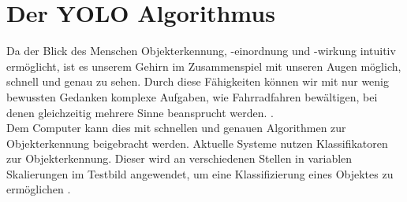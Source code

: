 { 
	
	\section{Der YOLO Algorithmus \label{subsec:YOLO_Alg}} 
	{Da der Blick des Menschen Objekterkennung, -einordnung und -wirkung intuitiv ermöglicht, ist es unserem Gehirn im Zusammenspiel mit unseren Augen möglich, schnell und genau zu sehen. Durch diese Fähigkeiten können wir mit nur wenig bewussten Gedanken komplexe Aufgaben, wie Fahrradfahren bewältigen, bei denen gleichzeitig mehrere Sinne beansprucht werden. \citep{Redmon2016}. \\
	Dem Computer kann dies mit schnellen und genauen Algorithmen zur Objekterkennung beigebracht werden. Aktuelle Systeme nutzen Klassifikatoren zur Objekterkennung. Dieser wird an verschiedenen Stellen in variablen Skalierungen im Testbild angewendet, um eine Klassifizierung eines Objektes zu ermöglichen \citep{Redmon2016}. \\ 
	
}}
